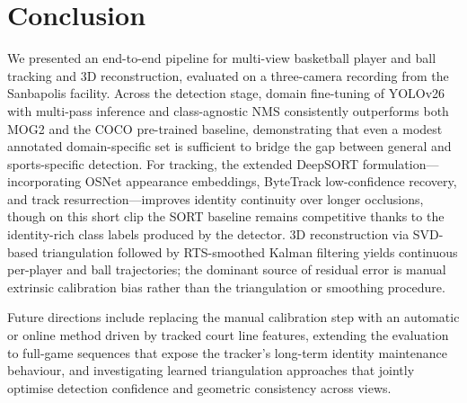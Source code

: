 \section{Conclusion}\label{sec:conclusion}

We presented an end-to-end pipeline for multi-view basketball player and ball
tracking and 3D reconstruction, evaluated on a three-camera recording from the
Sanbapolis facility.
Across the detection stage, domain fine-tuning of YOLOv26 with multi-pass inference
and class-agnostic NMS consistently outperforms both MOG2 and the COCO pre-trained
baseline, demonstrating that even a modest annotated domain-specific set is
sufficient to bridge the gap between general and sports-specific detection.
For tracking, the extended DeepSORT formulation---incorporating OSNet appearance
embeddings, ByteTrack low-confidence recovery, and track resurrection---improves
identity continuity over longer occlusions, though on this short clip the SORT
baseline remains competitive thanks to the identity-rich class labels produced by
the detector.
3D reconstruction via SVD-based triangulation followed by RTS-smoothed Kalman
filtering yields continuous per-player and ball trajectories; the dominant source
of residual error is manual extrinsic calibration bias rather than the
triangulation or smoothing procedure.

Future directions include replacing the manual calibration step with an automatic or
online method driven by tracked court line features, extending the evaluation to
full-game sequences that expose the tracker's long-term identity maintenance
behaviour, and investigating learned triangulation approaches that jointly optimise
detection confidence and geometric consistency across views.
